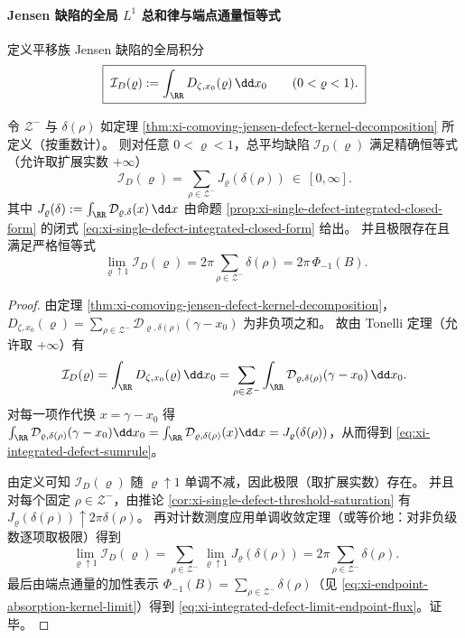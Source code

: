 \paragraph{Jensen 缺陷的全局 \texorpdfstring{$L^1$}{L1} 总和律与端点通量恒等式}
定义平移族 Jensen 缺陷的全局积分
\begin{equation}\label{eq:xi-integrated-defect-I}
\boxed{\;
\mathcal{I}_D(\varrho):=\int_{\RR}D_{\zeta,x_0}(\varrho)\,\dd x_0\qquad(0<\varrho<1).\;}
\end{equation}

\begin{theorem}\label{thm:xi-integrated-defect-sumrule-endpoint-flux}
 令 \(\mathcal{Z}^-\) 与 \(\delta(\rho)\) 如定理 \ref{thm:xi-comoving-jensen-defect-kernel-decomposition} 所定义（按重数计）。
 则对任意 \(0<\varrho<1\)，总平均缺陷 \(\mathcal{I}_D(\varrho)\) 满足精确恒等式（允许取扩展实数 \(+\infty\)）
\begin{equation}\label{eq:xi-integrated-defect-sumrule}
\boxed{\;
\mathcal{I}_D(\varrho)
=\sum_{\rho\in\mathcal{Z}^-}J_{\varrho}(\delta(\rho))\ \in\ [0,\infty].\;}
\end{equation}
其中 \(J_{\varrho}(\delta):=\int_{\RR}\mathcal{D}_{\varrho,\delta}(x)\,\dd x\) 由命题 \ref{prop:xi-single-defect-integrated-closed-form} 的闭式 \eqref{eq:xi-single-defect-integrated-closed-form} 给出。
并且极限存在且满足严格恒等式
\begin{equation}\label{eq:xi-integrated-defect-limit-endpoint-flux}
\boxed{\;
\lim_{\varrho\uparrow 1}\mathcal{I}_D(\varrho)
=2\pi\sum_{\rho\in\mathcal{Z}^-}\delta(\rho)
=2\pi\,\Phi_{-1}(B).\;}
\end{equation}
\end{theorem}

\begin{proof}
 由定理 \ref{thm:xi-comoving-jensen-defect-kernel-decomposition}，
 \(
 D_{\zeta,x_0}(\varrho)=\sum_{\rho\in\mathcal{Z}^-}\mathcal{D}_{\varrho,\delta(\rho)}(\gamma-x_0)
 \)
 为非负项之和。
故由 Tonelli 定理（允许取 \(+\infty\)）有
 \[
 \mathcal{I}_D(\varrho)
 =\int_{\RR}D_{\zeta,x_0}(\varrho)\,\dd x_0
 =\sum_{\rho\in\mathcal{Z}^-}\int_{\RR}\mathcal{D}_{\varrho,\delta(\rho)}(\gamma-x_0)\,\dd x_0.
 \]
 对每一项作代换 \(x=\gamma-x_0\) 得
 \(
 \int_{\RR}\mathcal{D}_{\varrho,\delta(\rho)}(\gamma-x_0)\dd x_0
 =\int_{\RR}\mathcal{D}_{\varrho,\delta(\rho)}(x)\dd x
 =J_{\varrho}(\delta(\rho))
 \)，从而得到 \eqref{eq:xi-integrated-defect-sumrule}。
 \par
 由定义可知 \(\mathcal{I}_D(\varrho)\) 随 \(\varrho\uparrow 1\) 单调不减，因此极限（取扩展实数）存在。
并且对每个固定 \(\rho\in\mathcal{Z}^-\)，由推论 \ref{cor:xi-single-defect-threshold-saturation} 有
 \(
 J_{\varrho}(\delta(\rho))\uparrow 2\pi\delta(\rho)
 \)。
再对计数测度应用单调收敛定理（或等价地：对非负级数逐项取极限）得到
 \[
 \lim_{\varrho\uparrow 1}\mathcal{I}_D(\varrho)
 =\sum_{\rho\in\mathcal{Z}^-}\lim_{\varrho\uparrow 1}J_{\varrho}(\delta(\rho))
 =2\pi\sum_{\rho\in\mathcal{Z}^-}\delta(\rho).
 \]
 最后由端点通量的加性表示 \(\Phi_{-1}(B)=\sum_{\rho\in\mathcal{Z}^-}\delta(\rho)\)（见 \eqref{eq:xi-endpoint-absorption-kernel-limit}）得到 \eqref{eq:xi-integrated-defect-limit-endpoint-flux}。证毕。
\end{proof}

